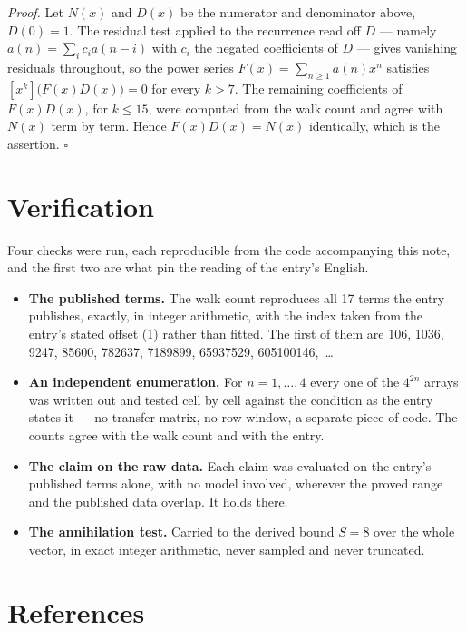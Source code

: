 \documentclass[11pt]{article}
\theoremstyle{definition}
\begin{document}
{\itshape Proof.} Let $N(x)$ and $D(x)$ be the numerator and denominator above, $D(0)=1$. The residual test applied to the recurrence read off $D$ --- namely $a(n) = \sum_i c_i a(n-i)$ with $c_i$ the negated coefficients of $D$ --- gives vanishing residuals throughout, so the power series $F(x)=\sum_{n\ge 1}a(n)x^n$ satisfies $[x^k]\bigl(F(x)D(x)\bigr) = 0$ for every $k > 7$. The remaining coefficients of $F(x)D(x)$, for $k \le 15$, were computed from the walk count and agree with $N(x)$ term by term. Hence $F(x)D(x) = N(x)$ identically, which is the assertion. $\square$

\section{Verification}

Four checks were run, each reproducible from the code accompanying this note, and the first two are what pin the reading of the entry's English.

\begin{itemize}

\item {\bfseries The published terms.} The walk count reproduces all 17 terms the entry publishes, exactly, in integer arithmetic, with the index taken from the entry's stated offset (1) rather than fitted. The first of them are 106, 1036, 9247, 85600, 782637, 7189899, 65937529, 605100146,~\dots

\item {\bfseries An independent enumeration.} For $n = 1,\dots,4$ every one of the $4^{2n}$ arrays was written out and tested cell by cell against the condition as the entry states it --- no transfer matrix, no row window, a separate piece of code. The counts agree with the walk count and with the entry.

\item {\bfseries The claim on the raw data.} Each claim was evaluated on the entry's published terms alone, with no model involved, wherever the proved range and the published data overlap. It holds there.

\item {\bfseries The annihilation test.} Carried to the derived bound $S = 8$ over the whole vector, in exact integer arithmetic, never sampled and never truncated.

\end{itemize}

\section{References}
\end{document}
